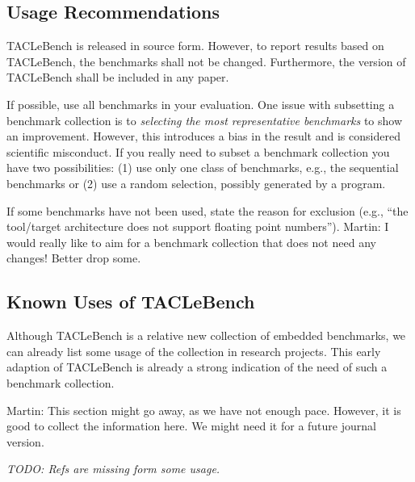 \documentclass[a4paper,UKenglish]{oasics}
\newcommand{\todo}[1]{{\emph{TODO: #1}}}
\newcommand{\martin}[1]{{\color{blue} Martin: #1}}
\begin{document}
\subsection{Usage Recommendations}
\label{usage}

TACLeBench is released in source form. However, to report
results based on TACLeBench, the benchmarks shall not be changed.
Furthermore, the version of TACLeBench shall be included in any paper.

If possible, use all benchmarks in your evaluation. One issue with subsetting
a benchmark collection is to \emph{selecting the most representative benchmarks}
to show an improvement. However, this introduces a bias in the result and
is considered scientific misconduct. If you really need to subset a benchmark collection you have
two possibilities: (1) use only one class of benchmarks, e.g., the sequential
benchmarks or (2) use a random selection, possibly generated by a program.

If some benchmarks have not been used, state the reason for exclusion
(e.g., ``the tool/target architecture does not support floating point numbers'').
\martin{I would really like to aim for a benchmark collection that does not
need any changes! Better drop some.}


\subsection{Known Uses of TACLeBench}

Although TACLeBench is a relative new collection of embedded benchmarks,
we can already list some usage of the collection in research projects.
This early adaption of TACLeBench is already a strong indication of
the need of such a benchmark collection.

\martin{This section might go away, as we have not enough pace.
However, it is good to collect the information here. We might need it
for a future journal version.}

\todo{Refs are missing form some usage.}
\end{document}
